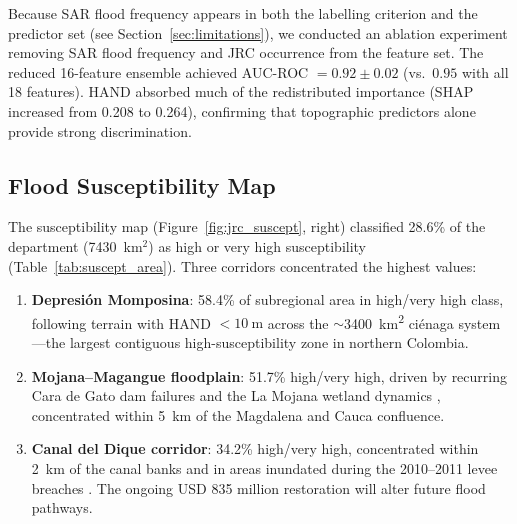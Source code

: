 \documentclass{article}
\begin{document}
Because SAR flood frequency appears in both the labelling criterion and the predictor set (see Section~\ref{sec:limitations}), we conducted an ablation experiment removing SAR flood frequency and JRC occurrence from the feature set. The reduced 16-feature ensemble achieved AUC-ROC $= 0.92 \pm 0.02$ (vs.\ $0.95$ with all 18 features). HAND absorbed much of the redistributed importance (SHAP increased from 0.208 to 0.264), confirming that topographic predictors alone provide strong discrimination.

\subsection{Flood Susceptibility Map}

The susceptibility map (Figure~\ref{fig:jrc_suscept}, right) classified 28.6\% of the department (\num{7430}~km$^2$) as high or very high susceptibility (Table~\ref{tab:suscept_area}). Three corridors concentrated the highest values:

\begin{enumerate}
    \item \textbf{Depresi\'on Momposina}: 58.4\% of subregional area in high/very high class, following terrain with HAND $< \SI{10}{\metre}$ across the $\sim$\SI{3400}{\kilo\metre\squared} ci\'enaga system \citep{Angarita2018}---the largest contiguous high-susceptibility zone in northern Colombia.

    \item \textbf{Mojana--Magangue floodplain}: 51.7\% high/very high, driven by recurring Cara de Gato dam failures and the La Mojana wetland dynamics \citep{ACAPS2024}, concentrated within \SI{5}{\kilo\metre} of the Magdalena and Cauca confluence.

    \item \textbf{Canal del Dique corridor}: 34.2\% high/very high, concentrated within \SI{2}{\kilo\metre} of the canal banks and in areas inundated during the 2010--2011 levee breaches \citep{Mogollon2016}. The ongoing USD 835 million restoration will alter future flood pathways.
\end{enumerate}
\end{document}
